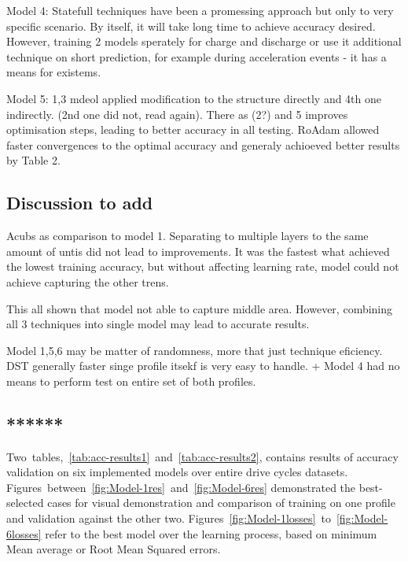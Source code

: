 %
%
Model 4: Statefull techniques have been a promessing approach but only to very specific scenario.
By itself, it will take long time to achieve accuracy desired.
However, training 2 models sperately for charge and discharge or use it additional technique on short prediction, for example during acceleration events - it has a means for existems.

%
%
Model 5: 1,3 mdeol applied modification to the structure directly and 4th one indirectly. (2nd one did not, read again).
There as (2?) and 5 improves optimisation steps, leading to better accuracy in all testing.
RoAdam allowed faster convergences to the optimal accuracy and generaly achioeved better results by Table 2.

%
%
\subsection{Discussion to add}
Acubs as comparison to model 1.
Separating to multiple layers to the same amount of untis did not lead to improvements.
It was the fastest what achieved the lowest training accuracy, but without affecting learning rate, model could not achieve capturing the other trens.

%
%
This all shown that model not able to capture middle area.
However, combining all 3 techniques into single model may lead to accurate results.

%
%
Model 1,5,6 may be matter of randomness, more that just technique eficiency.
DST generally faster singe profile itsekf is very easy to handle.
+ Model 4 had no means to perform test on entire set of both profiles.
%
%
\subsection{******}
\mbox{Two tables, \ref{tab:acc-results1} and \ref{tab:acc-results2}}, contains results of accuracy validation on six implemented models over entire drive cycles datasets.
\mbox{Figures between \ref{fig:Model-1res} and \ref{fig:Model-6res}} demonstrated the best-selected cases for visual demonstration and comparison of training on one profile and validation against the other two.
\mbox{Figures \ref{fig:Model-1losses} to \ref{fig:Model-6losses}} refer to the best model over the learning process, based on minimum Mean average or Root Mean Squared errors.

